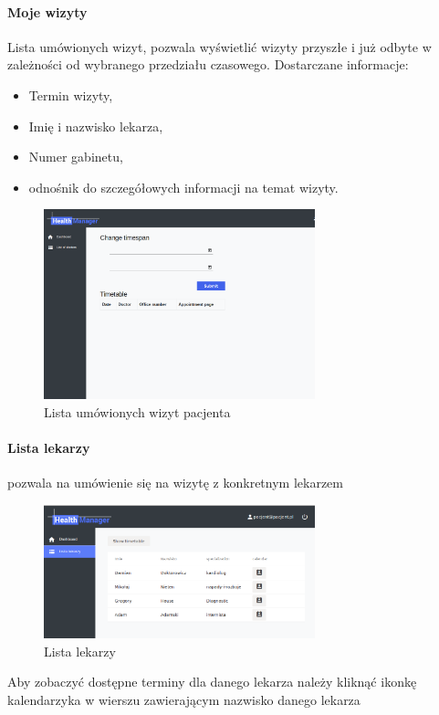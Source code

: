 \documentclass[polish,12pt]{aghthesis}
\begin{document}
    \paragraph{Moje wizyty}{Lista umówionych wizyt, pozwala wyświetlić wizyty przyszłe i już odbyte w zależności od wybranego przedziału czasowego. Dostarczane informacje:
    \begin{itemize}
        \item Termin wizyty,
        \item Imię i nazwisko lekarza,
        \item Numer gabinetu,
        \item odnośnik do szczegółowych informacji na temat wizyty.
    \end{itemize}
        \begin{figure}[H]
        \includegraphics[width=0.7\textwidth]{gui-patient-my-visits}
        \caption{Lista umówionych wizyt pacjenta}
    \end{figure}    
    }
    \paragraph{Lista lekarzy} pozwala na umówienie się na wizytę z konkretnym lekarzem
    \begin{figure}[H]
        \includegraphics[width=0.7\textwidth]{gui-doctor-list}
        \caption{Lista lekarzy}
    \end{figure}
    Aby zobaczyć dostępne terminy dla danego lekarza należy kliknąć ikonkę kalendarzyka w wierszu zawierającym nazwisko danego lekarza
\end{document}
